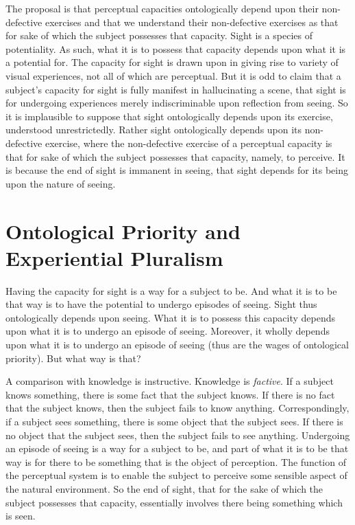 \documentclass[12pt]{article}
\begin{document}
The proposal is that perceptual capacities ontologically depend upon their non-defective exercises and that we understand their non-defective exercises as that for sake of which the subject possesses that capacity. Sight is a species of potentiality. As such, what it is to possess that capacity depends upon what it is a potential for. The capacity for sight is drawn upon in giving rise to variety of visual experiences, not all of which are perceptual. But it is odd to claim that a subject's capacity for sight is fully manifest in hallucinating a scene, that sight is for undergoing experiences merely indiscriminable upon reflection from seeing. So it is implausible to suppose that sight ontologically depends upon its exercise, understood unrestrictedly. Rather sight ontologically depends upon its non-defective exercise, where the non-defective exercise of a perceptual capacity is that for sake of which the subject possesses that capacity, namely, to perceive. It is because the end of sight is immanent in seeing, that sight depends for its being upon the nature of seeing.


\section{Ontological Priority and Experiential Pluralism} %
\label{sec:ontological_dependence_and_experiential_pluralism}

Having the capacity for sight is a way for a subject to be. And what it is to be that way is to have the potential to undergo episodes of seeing. Sight thus ontologically depends upon seeing. What it is to possess this capacity depends upon what it is to undergo an episode of seeing. Moreover, it wholly depends upon what it is to undergo an episode of seeing (thus are the wages of ontological priority). But what way is that?

A comparison with knowledge is instructive. Knowledge is \emph{factive}. If a subject knows something, there is some fact that the subject knows. If there is no fact that the subject knows, then the subject fails to know anything. Correspondingly, if a subject sees something, there is some object that the subject sees. If there is no object that the subject sees, then the subject fails to see anything. Undergoing an episode of seeing is a way for a subject to be, and part of what it is to be that way is for there to be something that is the object of perception. The function of the perceptual system is to enable the subject to perceive some sensible aspect of the natural environment. So the end of sight, that for the sake of which the subject possesses that capacity, essentially involves there being something which is seen.
\end{document}
